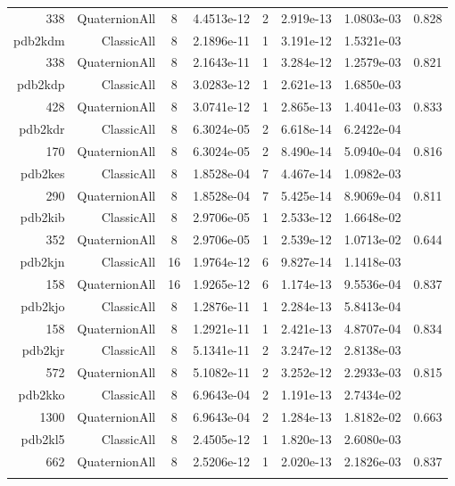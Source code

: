 \begin{xltabular}{\textwidth}{r|rcS[table-format=1.4e+2]cS[table-format=1.3e+2]S[table-format=1.4e+2]S[table-format=-1.3]}
338 & QuaternionAll & 8 & 4.4513e-12 & 2 & 2.919e-13 & 1.0803e-03 & 0.828\\  \addlinespace
pdb2kdm & ClassicAll & 8 & 2.1896e-11 & 1 & 3.191e-12 & 1.5321e-03 & \\
338 & QuaternionAll & 8 & 2.1643e-11 & 1 & 3.284e-12 & 1.2579e-03 & 0.821\\  \addlinespace
pdb2kdp & ClassicAll & 8 & 3.0283e-12 & 1 & 2.621e-13 & 1.6850e-03 & \\
428 & QuaternionAll & 8 & 3.0741e-12 & 1 & 2.865e-13 & 1.4041e-03 & 0.833\\  \addlinespace
pdb2kdr & ClassicAll & 8 & 6.3024e-05 & 2 & 6.618e-14 & 6.2422e-04 & \\
170 & QuaternionAll & 8 & 6.3024e-05 & 2 & 8.490e-14 & 5.0940e-04 & 0.816\\  \addlinespace
pdb2kes & ClassicAll & 8 & 1.8528e-04 & 7 & 4.467e-14 & 1.0982e-03 & \\
290 & QuaternionAll & 8 & 1.8528e-04 & 7 & 5.425e-14 & 8.9069e-04 & 0.811\\  \addlinespace
pdb2kib & ClassicAll & 8 & 2.9706e-05 & 1 & 2.533e-12 & 1.6648e-02 & \\
352 & QuaternionAll & 8 & 2.9706e-05 & 1 & 2.539e-12 & 1.0713e-02 & 0.644\\  \addlinespace
pdb2kjn & ClassicAll & 16 & 1.9764e-12 & 6 & 9.827e-14 & 1.1418e-03 & \\
158 & QuaternionAll & 16 & 1.9265e-12 & 6 & 1.174e-13 & 9.5536e-04 & 0.837\\  \addlinespace
pdb2kjo & ClassicAll & 8 & 1.2876e-11 & 1 & 2.284e-13 & 5.8413e-04 & \\
158 & QuaternionAll & 8 & 1.2921e-11 & 1 & 2.421e-13 & 4.8707e-04 & 0.834\\  \addlinespace
pdb2kjr & ClassicAll & 8 & 5.1341e-11 & 2 & 3.247e-12 & 2.8138e-03 & \\
572 & QuaternionAll & 8 & 5.1082e-11 & 2 & 3.252e-12 & 2.2933e-03 & 0.815\\  \addlinespace
pdb2kko & ClassicAll & 8 & 6.9643e-04 & 2 & 1.191e-13 & 2.7434e-02 & \\
1300 & QuaternionAll & 8 & 6.9643e-04 & 2 & 1.284e-13 & 1.8182e-02 & 0.663\\  \addlinespace
pdb2kl5 & ClassicAll & 8 & 2.4505e-12 & 1 & 1.820e-13 & 2.6080e-03 & \\
662 & QuaternionAll & 8 & 2.5206e-12 & 1 & 2.020e-13 & 2.1826e-03 & 0.837\\  \addlinespace

\end{xltabular}
